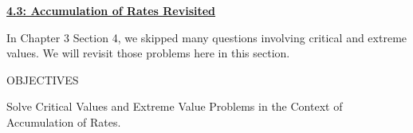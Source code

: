 \textbf{\underline{\large{4.3: Accumulation of Rates Revisited}}} \par

In Chapter 3 Section 4, we skipped many questions involving critical and extreme values. We will revisit those problems here in this section. \par

\begin{tcolorbox}[objective]
    \begin{center}
        OBJECTIVES \\[11pt]
    \end{center}
    Solve Critical Values and Extreme Value Problems in the Context of Accumulation of Rates.
\end{tcolorbox} \vspace{11pt}

